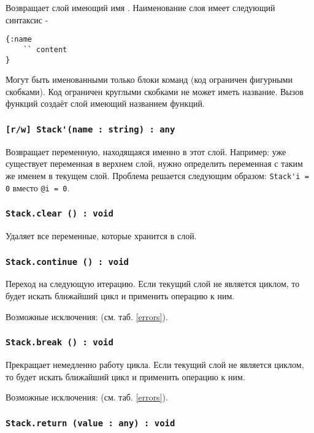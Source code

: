 Возвращает слой имеющий имя . Наименование слоя имеет следующий синтаксис -
\begin{lstlisting}[numbers=none]
{:name
	`` content
}
\end{lstlisting}
Могут быть именованными только блоки команд (код ограничен фигурными скобками). Код ограничен круглыми скобками не может иметь название. Вызов функций создаёт слой имеющий названием функций.

\subsubsection{\lstinline|[r/w] Stack'(name : string) : any|}

Возвращает переменную, находящаяся именно в этот слой. Например: уже существует переменная  в верхнем слой, нужно определить переменная с таким же именем в текущем слой. Проблема решается следующим образом: \lstinline|Stack'i = 0| вместо \lstinline|@i = 0|.

\subsubsection{\lstinline|Stack.clear () : void|}

Удаляет все переменные, которые хранится в слой.

\subsubsection{\lstinline|Stack.continue () : void|}

Переход на следующую итерацию. Если текущий слой не является циклом, то будет искать ближайший цикл и применить операцию к ним.

Возможные исключения:  (см. таб. \ref{errors}).

\subsubsection{\lstinline|Stack.break () : void|}

Прекращает немедленно работу цикла. Если текущий слой не является циклом, то будет искать ближайший цикл и применить операцию к ним.

Возможные исключения:  (см. таб. \ref{errors}).

\subsubsection{\lstinline|Stack.return (value : any) : void|}


